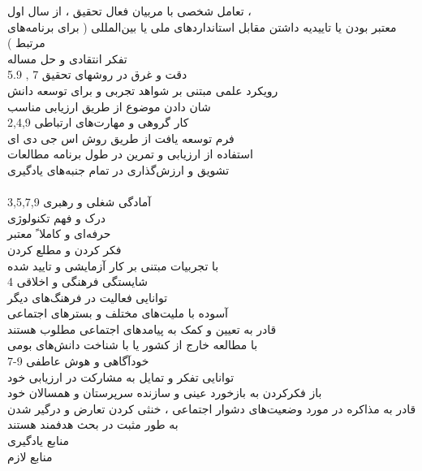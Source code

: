 \documentclass[a4 paper,12pt]{article}\usepackage{float, graphicx,xepersian }
\begin{document}
تعامل شخصی با مربیان فعال تحقیق ، از سال اول ،\\
معتبر بودن یا تاییدیه داشتن مقابل استانداردهای ملی یا بین‌المللی ( برای برنامه‌های مرتبط )\\
تفکر انتقادی و حل مساله \\
دقت و غرق در روشهای تحقیق                                    7 , 5.9 \\
رویکرد علمی مبتنی بر شواهد تجربی و برای توسعه دانش\\
شان دادن موضوع از طریق ارزیابی مناسب \\
کار گروهی و مهارت‌های ارتباطی                                                                                                                    2,4,9\\
فرم توسعه یافت از طریق روش اس جی دی ای\\
استفاده از ارزیابی و تمرین در طول برنامه مطالعات\\
تشویق و ارزش‌گذاری در تمام جنبه‌های یادگیری\\
\\
آمادگی شغلی و رهبری                                                                                                 3,5,7,9\\
درک و فهم تکنولوژی\\
حرفه‌ای و کاملا ً معتبر\\
فکر کردن و مطلع کردن\\
با تجربیات مبتنی بر کار آزمایشی و تایید شده\\
شایستگی فرهنگی و اخلاقی                                                                                             4\\
\noindent
توانایی فعالیت در فرهنگ‌های دیگر\\
آسوده با ملیت‌های مختلف و بسترهای اجتماعی\\
قادر به تعیین و کمک به پیامدهای اجتماعی مطلوب هستند\\ 
با مطالعه خارج از کشور یا با شناخت دانش‌های بومی \\
خودآگاهی و هوش عاطفی                                                                                                 9-7\\
\noindent
توانایی تفکر و تمایل به مشارکت در ارزیابی خود\\
باز فکرکردن به بازخورد عینی و سازنده سرپرستان و همسالان خود\\
قادر به مذاکره در مورد وضعیت‌های دشوار اجتماعی ، خنثی کردن تعارض و درگیر شدن به طور مثبت در بحث هدفمند هستند \\
منابع یادگیری \\
منابع لازم\\
\end{document}
